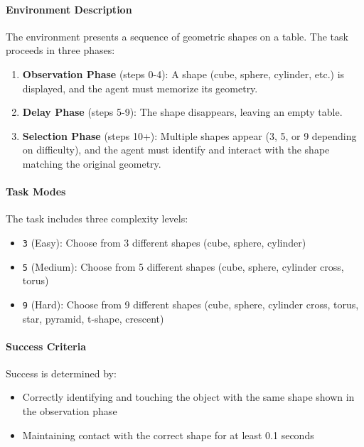 \paragraph{Environment Description} The environment presents a sequence of geometric shapes on a table. The task proceeds in three phases:
\begin{enumerate}
    \item \textbf{Observation Phase} (steps 0-4): A shape (cube, sphere, cylinder, etc.) is displayed, and the agent must memorize its geometry.
    \item \textbf{Delay Phase} (steps 5-9): The shape disappears, leaving an empty table.
    \item \textbf{Selection Phase} (steps 10+): Multiple shapes appear (3, 5, or 9 depending on difficulty), and the agent must identify and interact with the shape matching the original geometry.
\end{enumerate}

\paragraph{Task Modes} The task includes three complexity levels:
\begin{itemize}
    \item \texttt{3} (Easy): Choose from 3 different shapes (cube, sphere, cylinder)
    \item \texttt{5} (Medium): Choose from 5 different shapes (cube, sphere, cylinder cross, torus)
    \item \texttt{9} (Hard): Choose from 9 different shapes (cube, sphere, cylinder cross, torus, star, pyramid, t-shape, crescent)
\end{itemize}

\paragraph{Success Criteria} Success is determined by:
\begin{itemize}
    \item Correctly identifying and touching the object with the same shape shown in the observation phase
    \item Maintaining contact with the correct shape for at least 0.1 seconds
\end{itemize}

